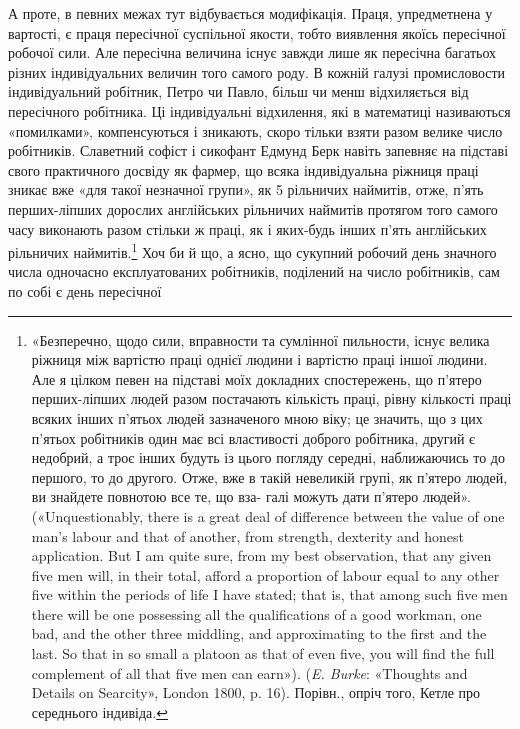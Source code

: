 А проте, в певних межах тут відбувається модифікація. Праця,
упредметнена у вартості, є праця пересічної суспільної якости,
тобто виявлення якоїсь пересічної робочої сили. Але пересічна
величина існує завжди лише як пересічна багатьох різних індивідуальних
величин того самого роду. В кожній галузі промисловости
індивідуальний робітник, Петро чи Павло, більш чи менш
відхиляється від пересічного робітника. Ці індивідуальні відхилення,
які в математиці називаються «помилками», компенсуються
і зникають, скоро тільки взяти разом велике число робітників.
Славетний софіст і сикофант Едмунд Берк навіть запевняє
на підставі свого практичного досвіду як фармер, що всяка індивідуальна
ріжниця праці зникає вже «для такої незначної групи»,
як 5 рільничих наймитів, отже, п’ять перших-ліпших дорослих
англійських рільничих наймитів протягом того самого часу виконають
разом стільки ж праці, як і яких-будь інших п’ять англійських
рільничих наймитів.\footnote{
«Безперечно, щодо сили, вправности та сумлінної пильности, існує
велика ріжниця між вартістю праці однієї людини і вартістю праці іншої
людини. Але я цілком певен на підставі моїх докладних спостережень, що
п’ятеро перших-ліпших людей разом постачають кількість праці, рівну
кількості праці всяких інших п'ятьох людей зазначеного мною віку; це
значить, що з цих п’ятьох робітників один має всі властивості доброго
робітника, другий є недобрий, а троє інших будуть із цього погляду середні,
наближаючись то до першого, то до другого. Отже, вже в такій
невеликій групі, як п’ятеро людей, ви знайдете повнотою все те, що вза-
галі можуть дати п'ятеро людей». («Unquestionably, there is a great deal
of difference between the value of one man’s labour and that of another,
from strength, dexterity and honest application. But I am quite sure, from
my best observation, that any given five men will, in their total, afford a
proportion of labour equal to any other five within the periods of life I have
stated; that is, that among such five men there will be one possessing all
the qualifications of a good workman, one bad, and the other three middling,
and approximating to the first and the last. So that in so small a platoon
as that of even five, you will find the full complement of all that five men
can earn»). (\emph{E. Burke}: «Thoughts and Details on Searcity», London
1800, p. 16). Порівн., опріч того, Кетле про середнього індивіда.
} Хоч би й що, а ясно, що сукупний
робочий день значного числа одночасно експлуатованих робітників,
поділений на число робітників, сам по собі є день пересічної
